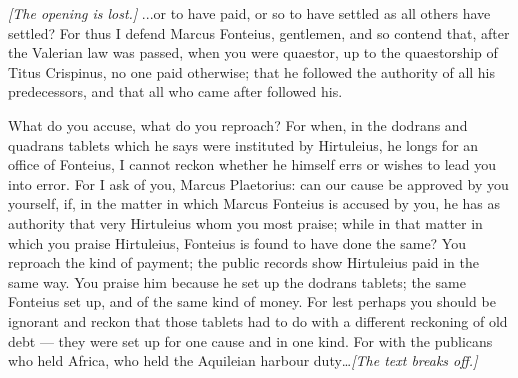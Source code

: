 %

 \textit{[The opening is lost.]} ...or to have paid, or so to have settled as all others have settled? For thus I defend Marcus Fonteius, gentlemen, and so contend that, after the Valerian law was passed, when you were quaestor, up to the quaestorship of Titus Crispinus, no one paid otherwise; that he followed the authority of all his predecessors, and that all who came after followed his.

 What do you accuse, what do you reproach? For when, in the dodrans and quadrans tablets which he says were instituted by Hirtuleius, he longs for an office of Fonteius, I cannot reckon whether he himself errs or wishes to lead you into error. For I ask of you, Marcus Plaetorius: can our cause be approved by you yourself, if, in the matter in which Marcus Fonteius is accused by you, he has as authority that very Hirtuleius whom you most praise; while in that matter in which you praise Hirtuleius, Fonteius is found to have done the same? You reproach the kind of payment; the public records show Hirtuleius paid in the same way. You praise him because he set up the dodrans tablets; the same Fonteius set up, and of the same kind of money. For lest perhaps you should be ignorant and reckon that those tablets had to do with a different reckoning of old debt --- they were set up for one cause and in one kind. For with the publicans who held Africa, who held the Aquileian harbour duty\ldots \textit{[The text breaks off.]}

